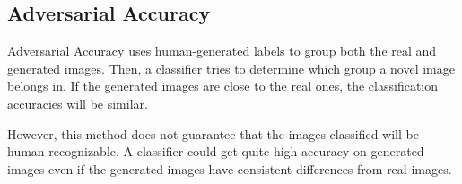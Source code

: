 \begin{comment}
Computes the classification accuracies achieved by these two classifiers on
a validation set, which can be the training set or another set of real images sampled from P(x). If
Pg(x) is close to P(x), we expect to see similar accuracies.
\end{comment}

\subsection{Adversarial Accuracy}
\label{sub:adversarial_accuracy}

Adversarial Accuracy uses human-generated labels to group both the real and generated images.
Then, a classifier tries to determine which group a novel image belongs in. If the generated images are close to the real ones, the classification accuracies will be similar. \cite{papernot2016distillation}

However, this method does not guarantee that the images classified will be human recognizable. 
A classifier could get quite high accuracy on generated images even if the generated images have consistent differences from real images. 